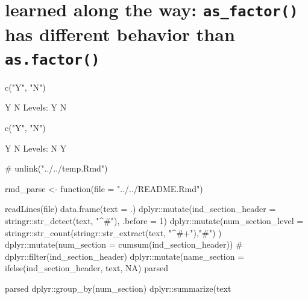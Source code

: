 \hypertarget{learned-along-the-way-as_factor-has-different-behavior-than-as.factor}{%
\section{\texorpdfstring{learned along the way: \texttt{as\_factor()}
has different behavior than
\texttt{as.factor()}}{learned along the way: as\_factor() has different behavior than as.factor()}}\label{learned-along-the-way-as_factor-has-different-behavior-than-as.factor}}

\begin{Schunk}
\begin{Sinput}
c("Y", "N") %
\end{Sinput}
\begin{Soutput}
     [1] Y N
     Levels: Y N
\end{Soutput}
\begin{Sinput}
c("Y", "N") %
\end{Sinput}
\begin{Soutput}
     [1] Y N
     Levels: N Y
\end{Soutput}
\end{Schunk}

\begin{Schunk}
\begin{Sinput}
# unlink("../../temp.Rmd")
\end{Sinput}
\end{Schunk}

\begin{Schunk}
\begin{Sinput}
rmd_parse <- function(file = "../../README.Rmd"){
  
  readLines(file) %
    data.frame(text = .) %
    dplyr::mutate(ind_section_header = stringr::str_detect(text, "^#"), .before = 1) %
    dplyr::mutate(num_section_level = stringr::str_count(stringr::str_extract(text, "^#+"),"#") ) %
    dplyr::mutate(num_section = cumsum(ind_section_header)) %
    # dplyr::filter(ind_section_header) %
    dplyr::mutate(name_section = ifelse(ind_section_header, text, NA) %
  parsed
  
  parsed %
    dplyr::group_by(num_section) %
    dplyr::summarize(text %
    
  
}
\end{Sinput}
\end{Schunk}



\address{%
Evangeline Reynolds\\
Affiliation\\%
line 1\\ line 2\\
%
\url{https://journal.r-project.org}\\%
\textit{ORCiD: \href{https://orcid.org/0000-0002-9079-593X}{0000-0002-9079-593X}}\\%
\href{mailto:author1@work}{\nolinkurl{author1@work}}%
}

